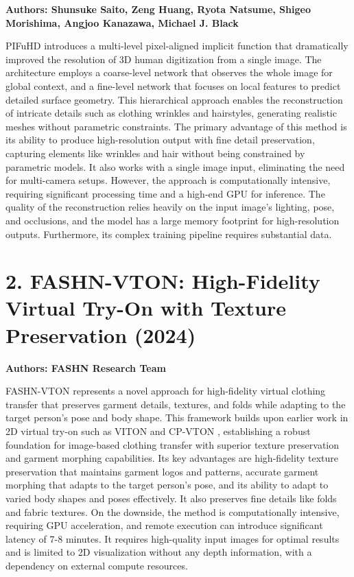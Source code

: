 \documentclass[12pt,a4paper,oneside]{report}
\begin{document}
\textbf{Authors: Shunsuke Saito, Zeng Huang, Ryota Natsume, Shigeo Morishima, Angjoo Kanazawa, Michael J. Black}

PIFuHD \cite{1} introduces a multi-level pixel-aligned implicit function that dramatically improved the resolution of 3D human digitization from a single image. The architecture employs a coarse-level network that observes the whole image for global context, and a fine-level network that focuses on local features to predict detailed surface geometry. This hierarchical approach enables the reconstruction of intricate details such as clothing wrinkles and hairstyles, generating realistic meshes without parametric constraints. The primary advantage of this method is its ability to produce high-resolution output with fine detail preservation, capturing elements like wrinkles and hair without being constrained by parametric models. It also works with a single image input, eliminating the need for multi-camera setups. However, the approach is computationally intensive, requiring significant processing time and a high-end GPU for inference. The quality of the reconstruction relies heavily on the input image's lighting, pose, and occlusions, and the model has a large memory footprint for high-resolution outputs. Furthermore, its complex training pipeline requires substantial data.

\section*{2. FASHN-VTON: High-Fidelity Virtual Try-On with Texture Preservation (2024)}

\textbf{Authors: FASHN Research Team}

FASHN-VTON \cite{16} represents a novel approach for high-fidelity virtual clothing transfer that preserves garment details, textures, and folds while adapting to the target person's pose and body shape. This framework builds upon earlier work in 2D virtual try-on such as VITON \cite{17} and CP-VTON \cite{18}, establishing a robust foundation for image-based clothing transfer with superior texture preservation and garment morphing capabilities. Its key advantages are high-fidelity texture preservation that maintains garment logos and patterns, accurate garment morphing that adapts to the target person's pose, and its ability to adapt to varied body shapes and poses effectively. It also preserves fine details like folds and fabric textures. On the downside, the method is computationally intensive, requiring GPU acceleration, and remote execution can introduce significant latency of 7-8 minutes. It requires high-quality input images for optimal results and is limited to 2D visualization without any depth information, with a dependency on external compute resources.
\end{document}
